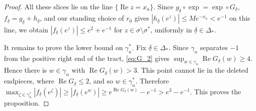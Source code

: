 \documentclass[a4paper, 11pt, reqno]{amsart}
\numberwithin{equation}{section}
\theoremstyle{plain}
\theoremstyle{remark}
\newcommand{\uldelta}{\underline{\delta}}
\newcommand{\Rea}{\operatorname{Re }}
\begin{document}
\begin{proof}
	All these slices lie on the line \(\{\Rea z=x_n\}\).  Since \(g_{\uldelta}\circ\exp=\exp\circ G_{\uldelta}\), \(f_{\uldelta}=g_{\uldelta}+h_{\uldelta}\), and our standing choice of \(r_0\) gives \(|h_{\uldelta}(e^z)|\le Me^{-x_n}<e^{-1}\) on this line, we obtain \(|f_{\uldelta}(e^z)|\le e^2+e^{-1}\) for \(z\in\sigma\setminus\sigma^*\), uniformly in \(\uldelta\in\Delta_*\).
	
	It remains to prove the lower bound on \(\gamma_n^*\).  Fix \(\uldelta\in\Delta_*\).  Since \(\gamma_n\) separates \(-1\) from the positive right end of the tract, \eqref{eq:G_2} gives \(\sup_{w\in\gamma_n}\Rea G_{\uldelta}(w)\ge4\).  Hence there is \(w\in\gamma_n\) with \(\Rea G_{\uldelta}(w)>3\).  This point cannot lie in the deleted endpieces, where \(\Rea G_{\uldelta}\le2\), and so \(w\in\gamma_n^*\).  Therefore \(\max_{\zeta\in\gamma_n^*}|f_{\uldelta}(e^\zeta)|\ge |f_{\uldelta}(e^w)|\ge e^{\Rea G_{\uldelta}(w)}-e^{-1}>e^3-e^{-1}\).  This proves the proposition.
\end{proof}
\end{document}
